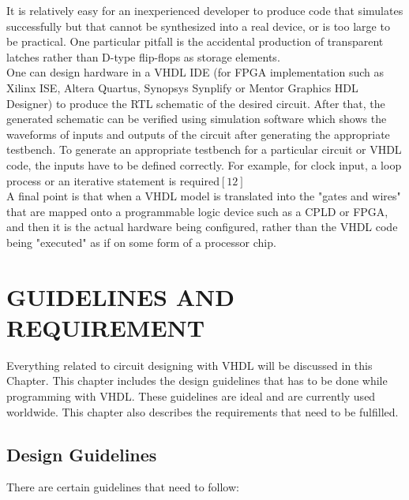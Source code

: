 \documentclass[12pt,a4paper]{article}
\begin{document}
It is relatively easy for an inexperienced developer to produce code that simulates successfully but that cannot be synthesized into a real device, or is too large to be practical. One particular pitfall is the accidental production of transparent latches rather than D-type flip-flops as storage elements.\\
One can design hardware in a VHDL IDE (for FPGA implementation such as Xilinx ISE, Altera Quartus, Synopsys Synplify or Mentor Graphics HDL Designer) to produce the RTL schematic of the desired circuit. After that, the generated schematic can be verified using simulation software which shows the waveforms of inputs and outputs of the circuit after generating the appropriate testbench. To generate an appropriate testbench for a particular circuit or VHDL code, the inputs have to be defined correctly. For example, for clock input, a loop process or an iterative statement is required$[12]$\\
A final point is that when a VHDL model is translated into the "gates and wires" that are mapped onto a programmable logic device such as a CPLD or FPGA, and then it is the actual hardware being configured, rather than the VHDL code being "executed" as if on some form of a processor chip.\\



\newpage

\renewcommand{\baselinestretch}{1.5} %
\section{GUIDELINES AND REQUIREMENT}
Everything related to circuit designing with VHDL will be discussed in this Chapter. This chapter includes the design guidelines that has to be done while programming with VHDL. These guidelines are ideal and are currently used worldwide. This chapter also describes the requirements that need to be fulfilled.\\

\subsection{Design Guidelines}
There are certain guidelines that need to follow:\\
\end{document}
